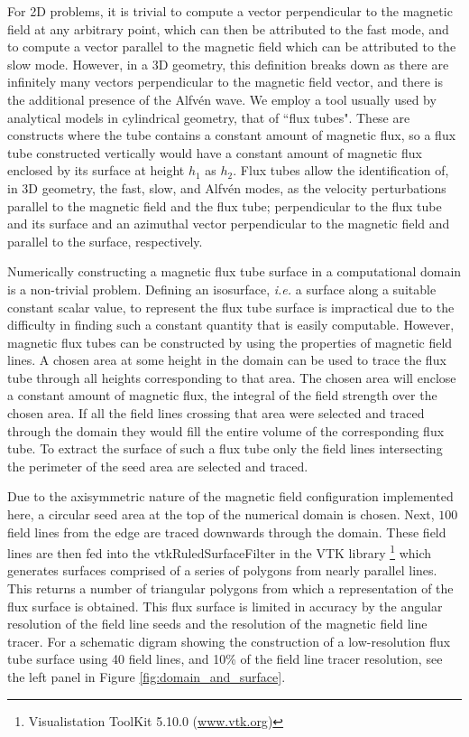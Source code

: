 For 2D problems, it is trivial to compute a vector perpendicular to the magnetic field at any arbitrary point, which can then be attributed to the fast mode, and to compute a vector parallel to the magnetic field which can be attributed to the slow mode.
 However, in a 3D geometry, this definition breaks down as there are infinitely many vectors perpendicular to the magnetic field vector, and there is the additional presence of the Alfv\'en wave. 
 We employ a tool usually used by analytical models in cylindrical geometry, that of ``flux tubes". 
 These are constructs where the tube contains a constant amount of magnetic flux, so a flux tube constructed vertically would have a constant amount of magnetic flux enclosed by its surface at height $h_1$ as $h_2$. 
 Flux tubes allow the identification of, in 3D geometry, the fast, slow, and Alfv\'{e}n modes, as the velocity perturbations parallel to the magnetic field and the flux tube; perpendicular to the flux tube and its surface and an azimuthal vector perpendicular to the magnetic field and parallel to the surface, respectively.

Numerically constructing a magnetic flux tube surface in a computational domain is a non-trivial problem.
 Defining an isosurface, \textit{i.e.} a surface along a suitable constant scalar value, to represent the flux tube surface is impractical due to the difficulty in finding such a constant quantity that is easily computable. 
 However, magnetic flux tubes can be constructed by using the properties of magnetic field lines. 
 A chosen area at some height in the domain can be used to trace the flux tube through all heights corresponding to that area. 
 The chosen area will enclose a constant amount of magnetic flux, the integral of the field strength over the chosen area.
 If all the field lines crossing that area were selected and traced through the domain they would fill the entire volume of the corresponding flux tube. 
 To extract the surface of such a flux tube only the field lines intersecting the perimeter of the seed area are selected and traced.

Due to the axisymmetric nature of the magnetic field configuration implemented here, a circular seed area at the top of the numerical domain is chosen.
 Next, $100$ field lines from the edge are traced downwards through the domain. 
 These field lines are then fed into the vtkRuledSurfaceFilter in the VTK library \footnote{Visualistation ToolKit 5.10.0 (\url{www.vtk.org})} which generates surfaces comprised of a series of polygons from nearly parallel lines.
 This returns a number of triangular polygons from which a representation of the flux surface is obtained. 
 This flux surface is limited in accuracy by the angular resolution of the field line seeds and the resolution of the magnetic field line tracer. 
 For a schematic digram showing the construction of a low-resolution flux tube surface using 40 field lines, and 10\% of the field line tracer resolution, see the left panel in Figure \ref{fig:domain_and_surface}.

